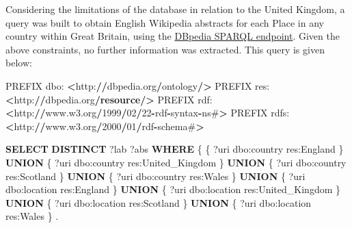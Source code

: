 \documentclass[10pt,]{article}
\renewcommand\texttt[1]{{\ttfamily\color{ttcolor}#1}}
\newenvironment{Shaded}{\begin{snugshade}}{\end{snugshade}}
\newcommand{\CharTok}[1]{\textcolor[rgb]{0.31,0.60,0.02}{#1}}
\newcommand{\DecValTok}[1]{\textcolor[rgb]{0.00,0.00,0.81}{#1}}
\newcommand{\FunctionTok}[1]{\textcolor[rgb]{0.00,0.00,0.00}{#1}}
\newcommand{\KeywordTok}[1]{\textcolor[rgb]{0.13,0.29,0.53}{\textbf{#1}}}
\newcommand{\NormalTok}[1]{#1}
\newcommand{\OperatorTok}[1]{\textcolor[rgb]{0.81,0.36,0.00}{\textbf{#1}}}
\begin{document}
Considering the limitations of the database in relation to the United
Kingdom, a query was built to obtain English Wikipedia abstracts for
each \texttt{Place} in any country within Great Britain, using the
\href{http://dbpedia.org/sparql}{DBpedia SPARQL endpoint}. Given the
above constraints, no further information was extracted. This query is
given below:

\vspace{2mm}

\begin{Shaded}
\begin{Highlighting}[]
\NormalTok{    PREFIX dbo: }\OperatorTok{\textless{}}\NormalTok{http:}\OperatorTok{//}\NormalTok{dbpedia.org}\OperatorTok{/}\NormalTok{ontology}\OperatorTok{/\textgreater{}}
\NormalTok{    PREFIX res: }\OperatorTok{\textless{}}\NormalTok{http:}\OperatorTok{//}\NormalTok{dbpedia.org}\OperatorTok{/}\KeywordTok{resource}\OperatorTok{/\textgreater{}}
\NormalTok{    PREFIX rdf: }\OperatorTok{\textless{}}\NormalTok{http:}\OperatorTok{//}\NormalTok{www.w3.org}\OperatorTok{/}\DecValTok{1999}\OperatorTok{/}\DecValTok{02}\OperatorTok{/}\DecValTok{22}\OperatorTok{{-}}\NormalTok{rdf}\OperatorTok{{-}}\NormalTok{syntax}\OperatorTok{{-}}\NormalTok{ns\#}\OperatorTok{\textgreater{}}
\NormalTok{    PREFIX rdfs: }\OperatorTok{\textless{}}\NormalTok{http:}\OperatorTok{//}\NormalTok{www.w3.org}\OperatorTok{/}\DecValTok{2000}\OperatorTok{/}\DecValTok{01}\OperatorTok{/}\NormalTok{rdf}\OperatorTok{{-}}\NormalTok{schema\#}\OperatorTok{\textgreater{}}

    \KeywordTok{SELECT} \KeywordTok{DISTINCT}\NormalTok{ ?lab ?}\FunctionTok{abs}
    \KeywordTok{WHERE}\NormalTok{ \{}
\NormalTok{            \{ ?uri dbo}\CharTok{:country}\NormalTok{ res}\CharTok{:England}\NormalTok{ \} }\KeywordTok{UNION}
\NormalTok{            \{ ?uri dbo}\CharTok{:country}\NormalTok{ res}\CharTok{:United\_Kingdom}\NormalTok{ \} }\KeywordTok{UNION}
\NormalTok{            \{ ?uri dbo}\CharTok{:country}\NormalTok{ res}\CharTok{:Scotland}\NormalTok{ \} }\KeywordTok{UNION}
\NormalTok{            \{ ?uri dbo}\CharTok{:country}\NormalTok{ res}\CharTok{:Wales}\NormalTok{ \} }\KeywordTok{UNION}
\NormalTok{            \{ ?uri dbo}\CharTok{:location}\NormalTok{ res}\CharTok{:England}\NormalTok{ \} }\KeywordTok{UNION}
\NormalTok{            \{ ?uri dbo}\CharTok{:location}\NormalTok{ res}\CharTok{:United\_Kingdom}\NormalTok{ \} }\KeywordTok{UNION}
\NormalTok{            \{ ?uri dbo}\CharTok{:location}\NormalTok{ res}\CharTok{:Scotland}\NormalTok{ \} }\KeywordTok{UNION}
\NormalTok{            \{ ?uri dbo}\CharTok{:location}\NormalTok{ res}\CharTok{:Wales}\NormalTok{ \} .}


\end{Highlighting}
\end{Shaded}
\end{document}
